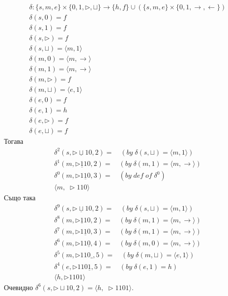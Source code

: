 \documentclass[14pt]{extarticle}
\begin{document}
\begin{align*}
    \delta : \{s, m, e\} \times \{0, 1, \triangleright, \sqcup\} \to \{h, f\} \cup (\{s, m, e\} \times \{0, 1, \rightarrow, \leftarrow \}) \\
    \delta(s, 0) = f \\
    \delta(s, 1) = f \\
    \delta(s, \triangleright) = f \\
    \delta(s, \sqcup) = \langle m, 1 \rangle \\
    \delta(m, 0) = \langle m, \rightarrow \rangle \\
    \delta(m, 1) = \langle m, \rightarrow \rangle \\
    \delta(m, \triangleright) = f \\
    \delta(m, \sqcup) = \langle e, 1 \rangle \\
    \delta(e, 0) = f \\
    \delta(e, 1) = h \\
    \delta(e, \triangleright) = f \\
    \delta(e, \sqcup) = f
\end{align*}
Тогава
\begin{align*}
    \delta^2(s, \triangleright \underline{\sqcup} 10, 2) =  \quad (by \; \delta(s, \sqcup) = \langle m, 1 \rangle)\\
    \delta^1(m, \triangleright \underline{1} 10, 2) = \quad (by \; \delta(m, 1) = \langle m, \rightarrow \rangle) \\
    \delta^0(m, \triangleright 1 \underline{1} 0, 3) =  \quad (by \; def \; of \; \delta^0) \\
    \langle m, \; \triangleright 1 10 \rangle
\end{align*}
Също така
\begin{align*}
    \delta^9(s, \triangleright \underline{\sqcup} 10, 2) =  \quad (by \; \delta(s, \sqcup) = \langle m, 1 \rangle)\\
    \delta^8(m, \triangleright \underline{1} 10, 2) = \quad (by \; \delta(m, 1) = \langle m, \rightarrow \rangle) \\
    \delta^7(m, \triangleright 1 \underline{1} 0, 3) =  \quad (by \; \delta(m, 1) = \langle m, \rightarrow \rangle) \\
    \delta^6(m, \triangleright 1 1 \underline{0}, 4) =  \quad (by \; \delta(m, 0) = \langle m, \rightarrow \rangle) \\
    \delta^5(m, \triangleright 1 1 0 \_, 5) =  \quad (by \; \delta(m, \sqcup) = \langle e, 1 \rangle) \\
    \delta^4(e, \triangleright 1 1 0 \underline{1}, 5) =  \quad (by \; \delta(e, 1) = h) \\
    \langle h, \triangleright 1 1 01\rangle
\end{align*}
Очевидно \(\delta^6(s, \triangleright \sqcup 10, 2) = \langle h,\; \triangleright 1 1 01\rangle\). \\
\end{document}
